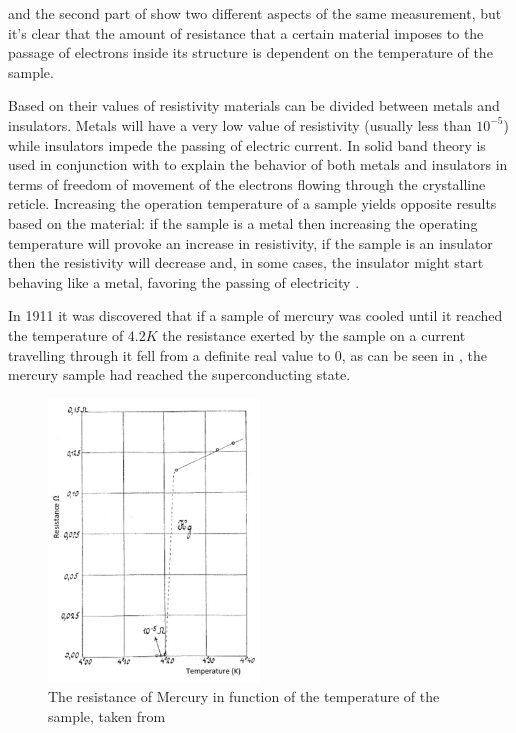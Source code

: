  and the second part of  show two
different aspects of the same measurement, but it's clear that the amount of resistance that a
certain material imposes to the passage of electrons inside its structure is dependent on the
temperature of the sample.

\medskip

Based on their values of resistivity materials can be divided between metals and insulators. Metals
will have a very low value of resistivity (usually less than $10^{-5}$) while insulators impede the
passing of electric current.
In \cite{slimani2022superconducting} solid band theory is used in conjunction with  to explain the behavior of both metals and insulators in terms of
freedom of movement of the electrons flowing through the crystalline reticle. Increasing the
operation temperature of a sample yields opposite results based on the material: if the sample is a
metal then increasing the operating temperature will provoke an increase in resistivity, if the
sample is an insulator then the resistivity will decrease and, in some cases, the insulator might
start behaving like a metal, favoring the passing of electricity \cite{slimani2022superconducting}.

\bigskip

In 1911 \cite{invention-superconductivity} it was discovered that if a sample of mercury was cooled
until it reached the temperature of $4.2K$ the resistance exerted by the sample on a current travelling
through it fell from a definite real value to $0$, as can be
seen in , the mercury sample had reached the superconducting state.
\begin{figure}
	\centering
	\includegraphics[width=0.5\textwidth]{./img/mercury-resistance.png}
	\caption{The resistance of Mercury in function of the temperature of the sample, taken from
		\cite{tsukerman2020compendium}}
	\label{img:mercury-resistance}
\end{figure}

